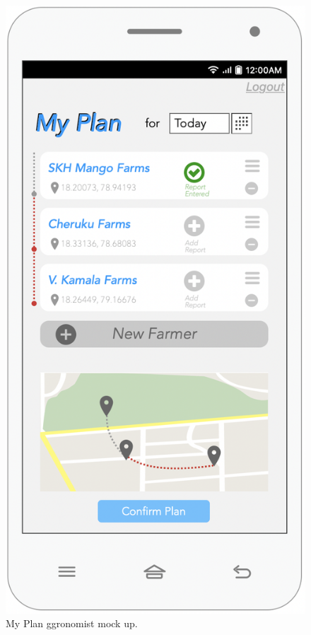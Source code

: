 \begin{multicols}{2}
\begin{figure}[H]
\centering
\includegraphics[scale=0.5]{../images_diagrams/mock_ups/myplan100.png}
\caption{\label{fig:mock_plan}My Plan ggronomist mock up.}
\end{figure}
\end{multicols}


